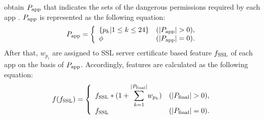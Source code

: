 \We obtain $P_{\mathrm{app}}$ that indicates the sets of the dangerous permissions required by each app . 
$P_{\mathrm{app}}$ is represented as the following equation: 
\begin{equation} 
  P_{\mathrm{app}} =
  \left\{
    \begin{array}{ll} 
      \{p_k|1\leq k \leq 24\} & (|P_{\mathrm{app}}| > 0), \\
      \phi & (|P_{\mathrm{app}}| = 0).
    \end{array}
  \right.
\end{equation}
After that, $w_{p_i}$ are assigned to SSL server certificate based feature $f_{\mathrm{SSL}}$ of each app on the basis of $P_{\mathrm{app}}$.
Accordingly, \our features are calculated as the following equation: 
\begin{equation} 
  f(f_{\mathrm{SSL}}) = 
  \left\{
    \begin{array}{ll} 
      f_{\mathrm{SSL}} * (1+ {\displaystyle \sum_{k=1}^{|P_{\mathrm{final}}|}} w_{p_k})  & (|P_{\mathrm{final}}| > 0), \\
      f_{\mathrm{SSL}} & (|P_{\mathrm{final}}| = 0).
    \end{array}
  \right.
\end{equation}

